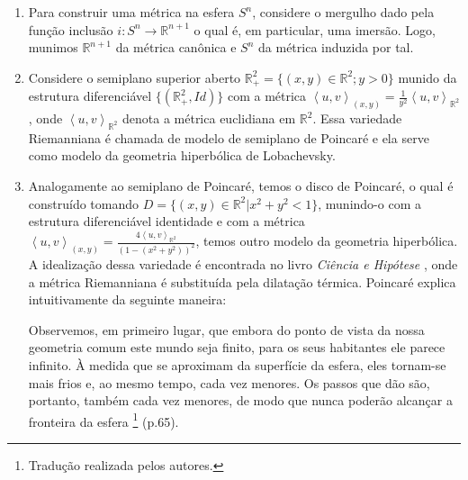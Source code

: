 \begin{examples}
\begin{enumerate}
		\item Para construir uma métrica na esfera $S^{n}$, considere o mergulho dado pela função inclusão $i:S^{n}\to \mathbb{R}^{n+1}$ o qual é, em particular, uma imersão. Logo, munimos $\mathbb{R}^{n+1}$ da métrica canônica e $S^{n}$ da métrica induzida por tal.
		\item Considere o semiplano superior aberto $\mathbb{R}^{2}_{+}=\{ (x,y) \in \mathbb{R}^{2}; y >0 \}$ munido da estrutura diferenciável $\{ (\mathbb{R}^{2}_{+},Id) \}$ com a métrica $\left<u,v\right>_{(x,y)}= \frac{1}{y^2}\left<u,v\right>_{\mathbb{R}^{2}}$, onde $\left<u,v\right>_{\mathbb{R}^{2}}$ denota a métrica euclidiana em $\mathbb{R}^{2}$. Essa variedade Riemanniana é chamada de modelo de semiplano de Poincaré e ela serve como modelo da geometria hiperbólica de Lobachevsky.
		\item Analogamente ao semiplano de Poincaré, temos o disco de Poincaré, o qual é construído tomando $D=\{ (x,y)\in \mathbb{R}^{2}|x^{2}+y^{2}< 1 \}$, munindo-o com a estrutura diferenciável identidade e com a métrica $\left<u,v\right>_{(x,y)}=\frac{4\left<u,v\right>_{\mathbb{R}^{2}}}{(1-(x^{2}+y^{2}))^{2}}$, temos outro modelo da geometria hiperbólica. A idealização dessa variedade é encontrada no livro \textit{Ciência e Hipótese} \cite{poincare1905}, onde a métrica Riemanniana é substituída pela dilatação térmica. Poincaré explica intuitivamente da seguinte maneira:
		      \begin{citacao}
			      Observemos, em primeiro lugar, que embora do ponto de vista da nossa geometria comum este mundo seja finito, para os seus habitantes ele parece infinito. À medida que se aproximam da superfície da esfera, eles tornam-se mais frios e, ao mesmo tempo, cada vez menores. Os passos que dão são, portanto, também cada vez menores, de modo que nunca poderão alcançar a fronteira da esfera \footnote{Tradução realizada pelos autores.} (p.65).
		      \end{citacao}
	\end{enumerate}
\end{examples}

